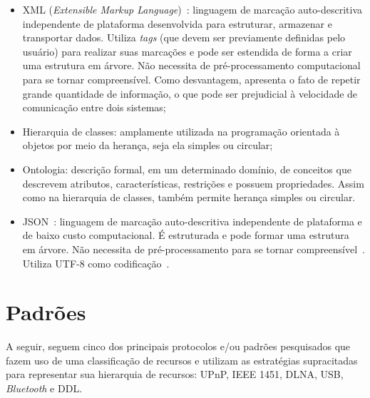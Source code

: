 \begin{itemize}
	\item XML (\emph{Extensible Markup Language})~\cite{xml}: linguagem de marcação auto-descritiva independente de plataforma desenvolvida para estruturar, armazenar e transportar dados. Utiliza \emph{tags} (que devem ser previamente definidas pelo usuário) para realizar suas marcações e pode ser estendida de forma a criar uma estrutura em árvore. Não necessita de pré-processamento computacional para se tornar compreensível. Como desvantagem, apresenta o fato de repetir grande quantidade de informação, o que pode ser prejudicial à velocidade de comunicação entre dois sistemas;

	\item Hierarquia de classes: amplamente utilizada na programação orientada à objetos por meio da herança, seja ela simples ou circular;

	\item Ontologia: descrição formal, em um determinado domínio, de conceitos que descrevem atributos, características, restrições e possuem propriedades. Assim como na hierarquia de classes, também permite herança simples ou circular.

	\item JSON~\cite{json}: linguagem de marcação auto-descritiva independente de plataforma e de baixo custo computacional. É estruturada e pode formar uma estrutura em árvore. Não necessita de pré-processamento para se tornar compreensível~\cite{comparativojson}. Utiliza UTF-8 como codificação~\cite{utf8}.
\end{itemize}

\section{Padrões}

A seguir, seguem cinco dos principais protocolos e/ou padrões pesquisados que fazem uso de uma classificação de recursos e utilizam as estratégias supracitadas para representar sua hierarquia de recursos: UPnP, IEEE 1451, DLNA, USB, \emph{Bluetooth} e DDL.








